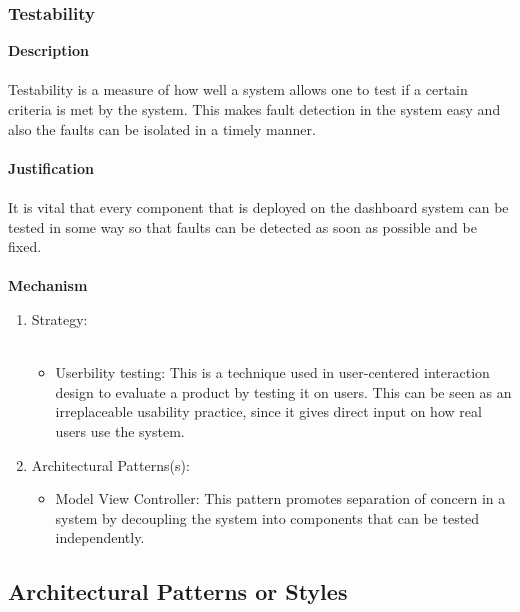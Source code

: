 \documentclass[hidelinks, 12pt, oneside]{article}
\begin{document}
			\subsubsection*{Testability}
			\textbf{Description}\\\\
			Testability is a measure of how well a system allows one to test if a certain criteria is met by the system. This makes fault detection in the system easy and also the faults can be isolated in a timely manner.\\\\
			\textbf{Justification}\\\\
			It is vital that every component that is deployed on the dashboard system can be tested in some way so that faults can be detected as soon as possible and be fixed. \\\\
			\textbf{Mechanism}
			\begin{enumerate}
				\item Strategy:\\\\
				\begin{itemize}
				\item Userbility testing: This is a technique used in user-centered interaction design to evaluate a product by testing it on users. This can be seen as an irreplaceable usability practice, since it gives direct input on how real users use the system.
				\end{itemize}
				\item Architectural Patterns(s):
				\begin{itemize}
				\item Model View Controller: This pattern promotes separation of concern in a system by decoupling the system into components that can be tested independently.   
				\end{itemize}
			\end{enumerate}	
    \newpage
    \subsection{Architectural Patterns or Styles}
\end{document}
